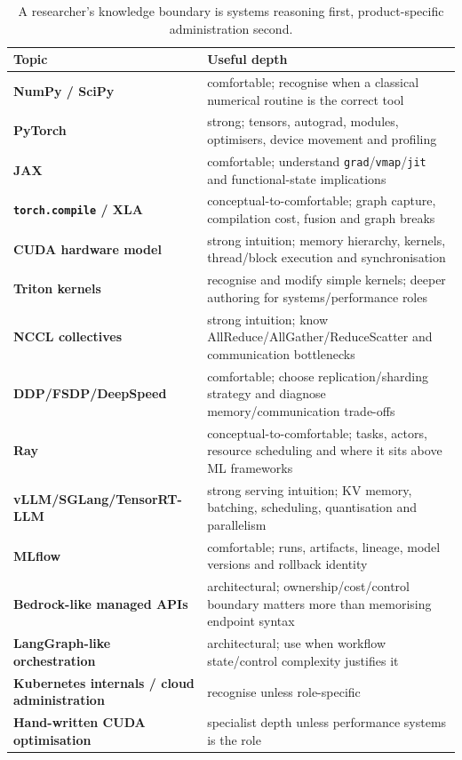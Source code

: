 \begin{table}[ht]
\centering
\small
\begin{tabularx}{\textwidth}{>{\bfseries}p{3.3cm} X}
\toprule
Topic & Useful depth \\
\midrule
NumPy / SciPy & comfortable; recognise when a classical numerical routine is the correct tool \\
PyTorch & strong; tensors, autograd, modules, optimisers, device movement and profiling \\
JAX & comfortable; understand \texttt{grad}/\texttt{vmap}/\texttt{jit} and functional-state implications \\
\texttt{torch.compile} / XLA & conceptual-to-comfortable; graph capture, compilation cost, fusion and graph breaks \\
CUDA hardware model & strong intuition; memory hierarchy, kernels, thread/block execution and synchronisation \\
Triton kernels & recognise and modify simple kernels; deeper authoring for systems/performance roles \\
NCCL collectives & strong intuition; know AllReduce/AllGather/ReduceScatter and communication bottlenecks \\
DDP/FSDP/DeepSpeed & comfortable; choose replication/sharding strategy and diagnose memory/communication trade-offs \\
Ray & conceptual-to-comfortable; tasks, actors, resource scheduling and where it sits above ML frameworks \\
vLLM/SGLang/TensorRT-LLM & strong serving intuition; KV memory, batching, scheduling, quantisation and parallelism \\
MLflow & comfortable; runs, artifacts, lineage, model versions and rollback identity \\
Bedrock-like managed APIs & architectural; ownership/cost/control boundary matters more than memorising endpoint syntax \\
LangGraph-like orchestration & architectural; use when workflow state/control complexity justifies it \\
Kubernetes internals / cloud administration & recognise unless role-specific \\
Hand-written CUDA optimisation & specialist depth unless performance systems is the role \\
\bottomrule
\end{tabularx}
\caption{A researcher's knowledge boundary is systems reasoning first, product-specific administration second.}
\label{tab:api-knowledge-boundary}
\end{table}


